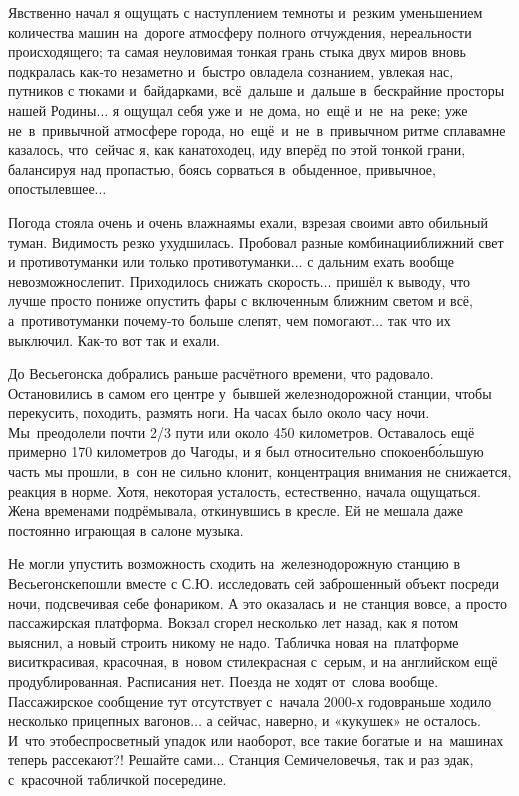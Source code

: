 Явственно начал я ощущать с наступлением темноты и~резким уменьшением количества машин на~дороге атмосферу полного отчуждения, нереальности происходящего; та самая неуловимая тонкая грань стыка двух миров вновь подкралась как-то незаметно и~быстро овладела сознанием, увлекая нас, путников с тюками и~байдарками, всё~дальше и~дальше в~бескрайние просторы нашей Родины$\ldots$ я ощущал себя уже и~не дома, но~ещё и~не~на~реке; уже не~в~привычной атмосфере города, но~ещё~и~не~в~привычном ритме сплава\mdash мне казалось, что~сейчас я, как канатоходец, иду вперёд по этой тонкой грани, балансируя над пропастью, боясь сорваться в~обыденное, привычное, опостылевшее$\ldots$

Погода стояла очень и очень влажная\mdash мы ехали, взрезая своими авто обильный туман. Видимость резко ухудшилась. Пробовал разные комбинации\mdash ближний свет и противотуманки или только противотуманки$\ldots$ с дальним ехать вообще невозможно\mdash слепит. Приходилось снижать скорость$\ldots$ пришёл к выводу, что лучше просто пониже опустить фары с включенным ближним светом и всё, а~противотуманки почему-то больше слепят, чем помогают$\ldots$ так что их выключил. Как-то вот так и ехали. 

До Весьегонска добрались раньше расчётного времени, что радовало. Остановились в самом его центре у~бывшей железнодорожной станции, чтобы перекусить, походить, размять ноги. На часах было около часу ночи. Мы~преодолели почти 2/3 пути или около 450 километров. Оставалось ещё примерно 170 километров до Чагоды, и я был относительно спокоен\mdash б\'{о}льшую часть мы прошли, в~сон не сильно клонит, концентрация внимания не снижается, реакция в норме. Хотя, некоторая усталость, естественно, начала ощущаться. Жена временами подрёмывала, откинувшись в кресле. Ей не мешала даже постоянно играющая в салоне музыка. 

Не могли упустить возможность сходить на~железнодорожную станцию в Весьегонске\mdash пошли вместе с С.Ю. исследовать сей заброшенный объект посреди ночи, подсвечивая себе фонариком. А это оказалась и~не станция вовсе, а просто пассажирская платформа. Вокзал сгорел несколько лет назад, как я потом выяснил, а новый строить никому не надо. Табличка новая на~платформе висит\mdash красивая, красочная, в~новом стиле\mdash красная с~серым, и на английском ещё продублированная. Расписания нет. Поезда не ходят от~слова вообще. Пассажирское сообщение тут отсутствует с~начала 2000-х годов\mdash раньше ходило несколько прицепных вагонов$\ldots$ а сейчас, наверно, и «кукушек» не осталось. И~что это\mdash беспросветный упадок или наоборот, все такие богатые и~на~машинах теперь рассекают?! Решайте сами$\ldots$ Станция Семичеловечья\cite{ГеографГлобусПропил}, так и раз эдак, с~красочной табличкой посередине.

